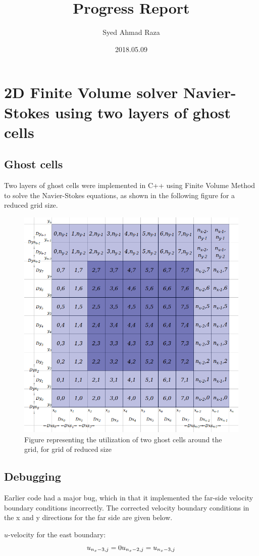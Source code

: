 \documentclass[12pt,a4paper,fleqn]{article}
\title{Progress Report}
\author{Syed Ahmad Raza}
\date{2018.05.09}
\begin{document}
\maketitle

\section{2D Finite Volume solver Navier-Stokes using two layers of ghost cells}

\subsection{Ghost cells}
Two layers of ghost cells were implemented in C++ using Finite Volume Method to solve the Navier-Stokes equations, as shown in the following figure for a reduced grid size.

\begin{figure}[H]
    \centering
    \includegraphics[width=0.65\linewidth]{grid_overview.png}
    \caption{Figure representing the utilization of two ghost cells around the grid, for grid of reduced size}
\end{figure}

\subsection{Debugging}
Earlier code had a major bug, which  in that it implemented the far-side velocity boundary conditions incorrectly. The corrected velocity boundary conditions in the x and y directions for the far side are given below.

\(u\)-velocity for the east boundary:
\begin{equation}
u_{n_x-3,j} = 0\\
u_{n_x-2,j} = u_{n_x-3,j}
\end{equation}
\end{document}
